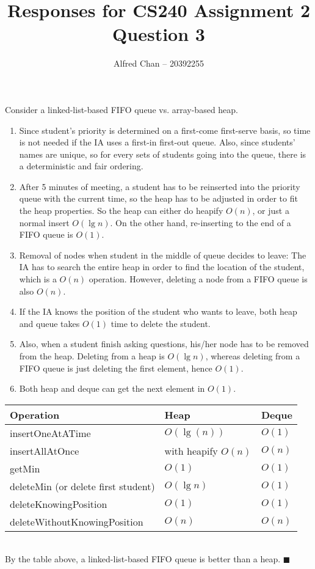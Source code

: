 \documentclass[12pt]{article}
\title{Responses for CS240 Assignment 2 Question 3}
\author{Alfred Chan -- 20392255}
\begin{document}
\maketitle

Consider a linked-list-based FIFO queue vs. array-based heap.
\begin{enumerate}
\item 
Since student's priority is determined on a first-come first-serve basis, so time is not needed if the IA uses a first-in first-out queue.
Also, since students' names are unique, so for every sets of students going into the queue, there is a deterministic and fair ordering.
\item After 5 minutes of meeting, a student has to be reinserted into the priority queue with the current time, so the heap has to be adjusted in order to fit the heap properties.
So the heap can either do heapify $O(n)$, or just a normal insert $O(\lg n)$.
On the other hand, re-inserting to the end of a FIFO queue is $O(1)$.
\item Removal of nodes when student in the middle of queue decides to leave:
The IA has to search the entire heap in order to find the location of the student, which is a $O(n)$ operation.
However, deleting a node from a FIFO queue is also $O(n)$.
\item If the IA knows the position of the student who wants to leave, both heap and queue takes $O(1)$ time to delete the student.
\item Also, when a student finish asking questions, his/her node has to be removed from the heap.
Deleting from a heap is $O(\lg n)$, whereas deleting from a FIFO queue is just deleting the first element, hence $O(1)$.
\item Both heap and deque can get the next element in $O(1)$.
\end{enumerate}

\begin{tabular}{| l | l | l |}
  \hline
	Operation & Heap & Deque\\
  \hline
	insertOneAtATime & $O(\lg(n))$ & $O(1)$\\
	insertAllAtOnce & with heapify $O(n)$ & $O(n)$\\
	getMin & $O(1)$ & $O(1)$\\
	deleteMin (or delete first student)& $O(\lg n)$ & $O(1)$\\
	deleteKnowingPosition & $O(1)$ & $O(1)$\\
	deleteWithoutKnowingPosition & $O(n)$ & $O(n)$\\
  \hline  
\end{tabular}\\
By the table above, a linked-list-based FIFO queue is better than a heap.
\hfill $\blacksquare$
\end{document}
